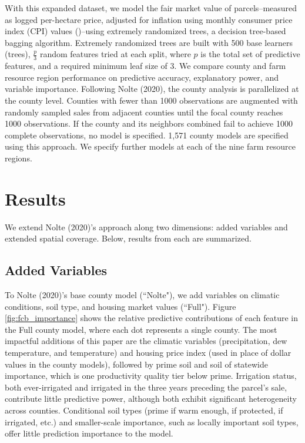 \documentclass[12pt]{article}
\begin{document}
With this expanded dataset, we model the fair market value of parcels--measured as logged per-hectare price, adjusted for inflation using monthly consumer price index (CPI) values (\cite{blsConsumerPrice})--using extremely randomized trees, a decision tree-based bagging algorithm. Extremely randomized trees are built with 500 base learners (trees), $\frac{p}{3}$ random features tried at each split, where $p$ is the total set of predictive features, and a required minimum leaf size of 3. We compare county and farm resource region performance on predictive accuracy, explanatory power, and variable importance. Following Nolte (2020), the county analysis is parallelized at the county level. Counties with fewer than 1000 observations are augmented with randomly sampled sales from adjacent counties until the focal county reaches 1000 observations. If the county and its neighbors combined fail to achieve 1000 complete observations, no model is specified. 1,571 county models are specified using this approach. We specify further models at each of the nine farm resource regions. 

\newpage

\section{Results}

We extend Nolte (2020)'s approach along two dimensions: added variables and extended spatial coverage. Below, results from each are summarized.

\subsection{Added Variables}

To Nolte (2020)'s base county model (``Nolte"), we add variables on climatic conditions, soil type, and housing market values (``Full"). Figure \ref{fig:fcb_importance} shows the relative predictive contributions of each feature in the Full county model, where each dot represents a single county. The most impactful additions of this paper are the climatic variables (precipitation, dew temperature, and temperature) and housing price index (used in place of dollar values in the county models), followed by prime soil and soil of statewide importance, which is one productivity quality tier below prime. Irrigation status, both ever-irrigated and irrigated in the three years preceding the parcel's sale, contribute little predictive power, although both exhibit significant heterogeneity across counties. Conditional soil types (prime if warm enough, if protected, if irrigated, etc.) and smaller-scale importance, such as locally important soil types, offer little prediction importance to the model.
\end{document}
